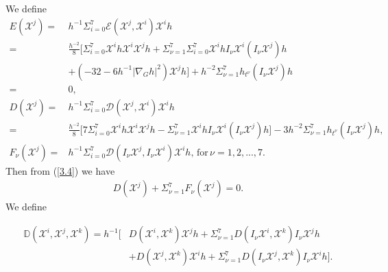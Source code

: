 \documentclass[reqno,12pt]{amsart}
\numberwithin{equation}{section}
\theoremstyle{plain}
\theoremstyle{definition}
\begin{document}
 We define  
\begin{align*}
   E(\mathscr{X}^j)=&h^{-1}\Sigma_{i=0}^7\mathcal{E}( \mathscr{X}^j, \mathscr{X}^i)\mathscr{X}^i h   \\=&\frac{h^{-2}}{8}\bigg[\Sigma_{i=0}^7\mathscr{X}^i h\mathscr{X}^i\mathscr{X}^jh+\Sigma_{\nu=1}^7\Sigma_{i=0}^7\mathscr{X}^ihI_\nu \mathscr{X}^i(I_\nu \mathscr{X}^j)h\\&+(-32-6h^{-1}|\nabla_G h|^2)\mathscr{X}^j h\bigg]+h^{-2}\Sigma_{\nu=1}^7h_{t^\nu}(I_\nu \mathscr{X}^j)h\\=&0,\\
    D(\mathscr{X}^j)=&h^{-1}\Sigma_{i=0}^7\mathcal{D}( \mathscr{X}^j, \mathscr{X}^i)\mathscr{X}^i h\\=&\frac{h^{-2}}{8}\bigg[7\Sigma_{i=0}^7\mathscr{X}^i h\mathscr{X}^i\mathscr{X}^j h-\Sigma_{\nu=1}^7 \mathscr{X}^ihI_\nu \mathscr{X}^i(I_\nu \mathscr{X}^j) h\bigg]-3h^{-2}\Sigma_{\nu=1}^7h_{t^\nu}(I_\nu \mathscr{X}^j)h,\\
    F_\nu(\mathscr{X}^j)=&h^{-1}\Sigma_{i=0}^7\mathcal{D}(I_\nu \mathscr{X}^j,I_\nu \mathscr{X}^i)\mathscr{X}^i h,\,\textrm{for}\,\nu=1,2,...,7.
\end{align*}   
Then from (\ref{3.4}) we have
\begin{align}\label{3.7}
    D(\mathscr{X}^j)+\Sigma_{\nu=1}^7 F_\nu (\mathscr{X}^j)=0.
\end{align}
We define

\begin{equation}\label{3.8}
\begin{aligned}
    \mathbb{D}(\mathscr{X}^i,\mathscr{X}^j,\mathscr{X}^k)=h^{-1}\bigg[&D(\mathscr{X}^i,\mathscr{X}^k)\mathscr{X}^jh+\Sigma_{\nu=1}^7D(I_\nu \mathscr{X}^i,\mathscr{X}^k)I_\nu \mathscr{X}^j h\\&+D(\mathscr{X}^j,\mathscr{X}^k)\mathscr{X}^ih+\Sigma_{\nu=1}^7D(I_\nu \mathscr{X}^j,\mathscr{X}^k)I_\nu \mathscr{X}^i h\bigg].
\end{aligned}
\end{equation}
\end{document}
